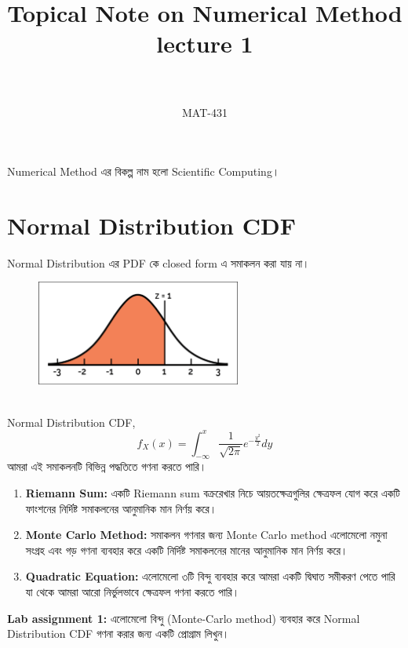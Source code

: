 \documentclass{article}
\title{\huge Topical Note on Numerical Method lecture 1}
\author{\textben{ দেবাশীষ চক্রবর্তী} \\
\textben{অধ্যাপক কাজী আশরাফুজ্জামান} \\
MAT-431}
\date{\textben{২২.৫.২০২৫}}
\newcommand{\textben}[1]{{\bengalifont #1}}
\begin{document}
\maketitle
Numerical Method\textben{ এর বিকল্প নাম হলো} Scientific Computing\textben{।}
\section{Normal Distribution CDF}
Normal Distribution\textben{ এর} PDF \textben{কে} closed form \textben{এ সমাকলন করা যায় না।}
\begin{figure}[htbp]
  \centering
  \includegraphics[width=0.6\textwidth]{Normal_Distribution.png}
\end{figure}\\

Normal Distribution CDF, 
$$f_X(x) = \int_{-\infty}^x \frac{1}{\sqrt{2\pi}}e^{-\frac{y^2}{2}}dy$$
\textben{আমরা এই সমাকলনটি বিভিন্ন পদ্ধতিতে গণনা করতে পারি।} \\
\begin{enumerate}
\item \textbf{Riemann Sum:} \textben{একটি} Riemann sum \textben{বক্ররেখার নিচে আয়তক্ষেত্রগুলির ক্ষেত্রফল যোগ করে একটি ফাংশনের নির্দিষ্ট সমাকলনের আনুমানিক মান নির্ণয় করে।}
\item \textbf{Monte Carlo Method:} \textben{সমাকলন গণনার জন্য} Monte Carlo method \textben{এলোমেলো নমুনা সংগ্রহ এবং গড় গণনা ব্যবহার করে একটি নির্দিষ্ট সমাকলনের মানের আনুমানিক মান নির্ণয় করে।}
\item \textbf{Quadratic Equation:} \textben{এলোমেলো ৩টি বিন্দু ব্যবহার করে আমরা একটি দ্বিঘাত সমীকরণ পেতে পারি যা থেকে আমরা আরো নির্ভুলভাবে ক্ষেত্রফল গণনা করতে পারি।}
\end{enumerate}
\textbf{Lab assignment 1:} \textben{এলোমেলো বিন্দু} (Monte-Carlo method) \textben{ব্যবহার করে} Normal Distribution CDF \textben{গণনা করার জন্য একটি প্রোগ্রাম লিখুন।}
\newpage
\end{document}
